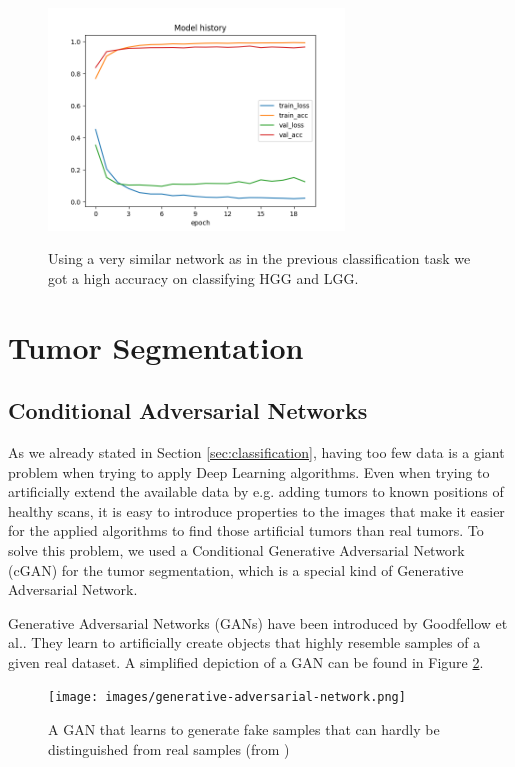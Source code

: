 \documentclass[a4paper,12pt,pagesize,headsepline,bibtotoc,titlepage]{scrartcl}
\begin{document}
\begin{figure}[hbp]
\begin{center}
\includegraphics*[width=0.7\textwidth]{images/hgg_lgg_history.png}\\
\caption{Using a very similar network as in the previous classification task we got a high accuracy on classifying HGG and LGG.}
\label{fig:hgg_lgg_history}
\end{center}
\end{figure}


\section{Tumor Segmentation}
\label{sec:segmentation}
\subsection{Conditional Adversarial Networks}
As we already stated in Section \ref{sec:classification}, having too few data is a giant problem when trying to apply Deep Learning algorithms.
Even when trying to artificially extend the available data by e.g. adding tumors to known positions of healthy scans, it is easy to introduce properties to the images that make it easier for the applied algorithms to find those artificial tumors than real tumors.
To solve this problem, we used a Conditional Generative Adversarial Network (cGAN) for the tumor segmentation, which is a special kind of Generative Adversarial Network.

Generative Adversarial Networks (GANs) have been introduced by Goodfellow et al.\cite{GANs}.
They learn to artificially create objects that highly resemble samples of a given real dataset.
A simplified depiction of a GAN can be found in Figure \ref{fig:gan}.
\begin{figure}[hbp]
\begin{center}
\texttt{[image: images/generative-adversarial-network.png]}\\
\caption{A GAN that learns to generate fake samples that can hardly be distinguished from real samples (from \cite{KDnuggets_GAN})}
\label{fig:gan}
\end{center}
\end{figure}
\end{document}
